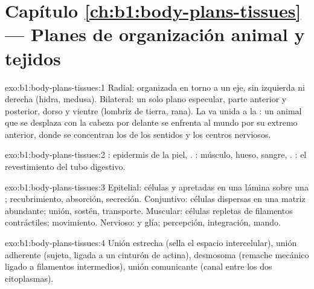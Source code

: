 \section*{Capítulo \ref{ch:b1:body-plans-tissues} --- Planes de organización animal y tejidos}

\begin{solution}{exo:b1:body-plans-tissues:1}
Radial: organizada en torno a un eje, sin izquierda ni derecha (hidra,
medusa). Bilateral: un solo plano especular, parte anterior y posterior,
dorso y vientre (lombriz de tierra, rana). La  va unida a la
: un animal que se desplaza con la cabeza por delante se
enfrenta al mundo por su extremo anterior, donde se concentran los 
de los sentidos y los centros nerviosos.
\end{solution}

\begin{solution}{exo:b1:body-plans-tissues:2}
: epidermis de la piel, . : músculo,
hueso, sangre, . : el revestimiento del tubo
digestivo.
\end{solution}

\begin{solution}{exo:b1:body-plans-tissues:3}
Epitelial: células  y apretadas en una lámina sobre una ; recubrimiento, absorción, secreción. Conjuntivo: células dispersas en
una matriz abundante; unión, sostén, transporte. Muscular: células repletas
de filamentos contráctiles; movimiento. Nervioso:  y glía;
percepción, integración, mando.
\end{solution}

\begin{solution}{exo:b1:body-plans-tissues:4}
Unión estrecha (sella el espacio intercelular), unión adherente (sujeta,
ligada a un cinturón de actina), desmosoma (remache mecánico ligado a
filamentos intermedios), unión comunicante (canal entre los dos
citoplasmas).
\end{solution}


